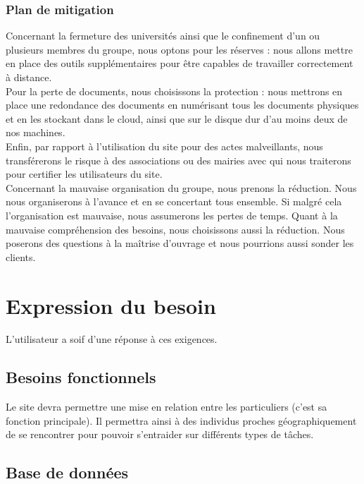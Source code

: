 \documentclass[a4paper,11pt]{article}
\begin{document}
\subsubsection{Plan de mitigation}

Concernant la fermeture des universités ainsi que le confinement d’un ou plusieurs membres du
groupe, nous optons pour les réserves : nous allons mettre en place des outils supplémentaires pour
être capables de travailler correctement à distance.\\

Pour la perte de documents, nous choisissons la protection : nous mettrons en place une redondance
des documents en numérisant tous les documents physiques et en les stockant dans le cloud, ainsi
que sur le disque dur d’au moins deux de nos machines.\\

Enfin, par rapport à l’utilisation du site pour des actes malveillants, nous transférerons le risque à des
associations ou des mairies avec qui nous traiterons pour certifier les utilisateurs du site.\\

Concernant la mauvaise organisation du groupe, nous prenons la réduction. Nous nous organiserons
à l'avance et en se concertant tous ensemble. Si malgré cela l'organisation est mauvaise, nous
assumerons les pertes de temps. Quant à la mauvaise compréhension des besoins, nous choisissons
aussi la réduction. Nous poserons des questions à la maîtrise d'ouvrage et nous pourrions aussi sonder
les clients.\\

\newpage
\section{Expression du besoin}

L’utilisateur a soif d’une réponse à ces exigences.

\subsection{Besoins fonctionnels}

Le site devra permettre une mise en relation entre les particuliers (c’est sa fonction principale). Il
permettra ainsi à des individus proches géographiquement de se rencontrer pour pouvoir s’entraider
sur différents types de tâches.\\

\subsection{Base de données}
\end{document}
